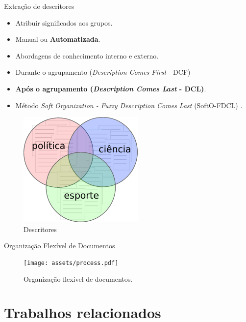 \documentclass[brazil]{beamer}
\begin{document}
\begin{frame}{Extração de descritores}
  \begin{itemize}
    \item<1 -> Atribuir significados aos grupos. 
    \item<2 -> Manual ou \textbf{Automatizada}. 
    \item<3 -> Abordagens de conhecimento interno e externo.
    \item<4 -> Durante o agrupamento ({\it Description Comes First\/} - DCF) 
    \item<4 -> \textbf{Após o agrupamento ({\it Description Comes Last\/} - DCL)}.
    \item<5 -> Método {\it Soft Organization - Fuzzy Description Comes Last\/} (SoftO-FDCL)
      \cite{Nogueira2013}.
  \end{itemize} 
  \begin{figure}[!htp] 
    \centering 
    \includegraphics[width=0.4\columnwidth]{assets/descriptors.pdf}
    \caption{Descritores} 
  \end{figure}
\end{frame}

\begin{frame}{Organização Flexível de Documentos}
  \begin{figure}[!htp] 
    \centering 
    \texttt{[image: assets/process.pdf]}
    \caption{Organização flexível de documentos.} 
  \end{figure}
\end{frame}

\section{Trabalhos relacionados}
\end{document}
